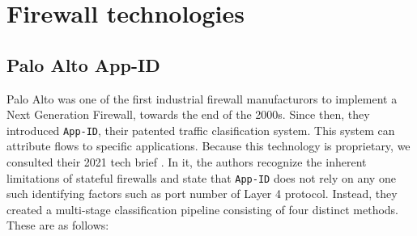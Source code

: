 \section{Firewall technologies}
\label{background:firewall}

\subsection{Palo Alto App-ID}

Palo Alto was one of the first industrial firewall manufacturors to implement a
Next Generation Firewall, towards the end of the 2000s. Since then, they
introduced \texttt{App-ID}, their patented traffic clasification system. This
system can attribute flows to specific applications. Because this technology is
proprietary, we consulted their 2021 tech brief \cite{paloalto2021appid}. In it,
the authors recognize the inherent limitations of stateful firewalls and state
that \texttt{App-ID} does not rely on any one such identifying factors such as
port number of Layer 4 protocol. Instead, they created a multi-stage
classification pipeline consisting of four distinct methods. These are as follows:

